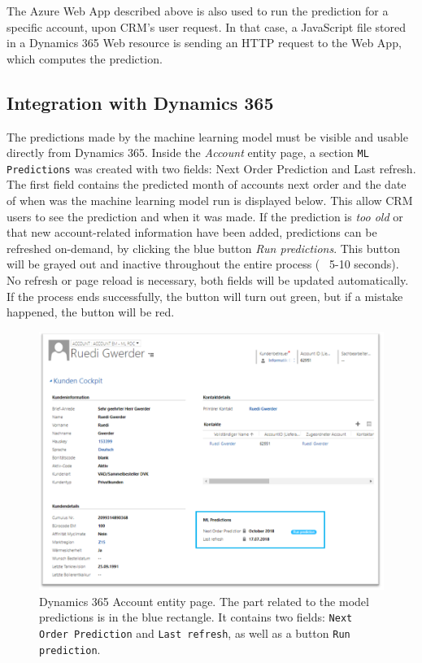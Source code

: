 The Azure Web App described above is also used to run the prediction for a specific account, upon CRM's user request. In that case, a JavaScript file stored in a Dynamics 365 Web resource is sending an HTTP request to the Web App, which computes the prediction.

\subsection{Integration with Dynamics 365}
The predictions made by the machine learning model must be visible and usable directly from Dynamics 365. Inside the \textit{Account} entity page, a section \texttt{ML Predictions} was created with two fields: Next Order Prediction and Last refresh. The first field contains the predicted month of accounts next order and the date of when was the machine learning model run is displayed below. This allow CRM users to see the prediction and when it was made. If the prediction is \textit{too old} or that new account-related information have been added, predictions can be refreshed on-demand, by clicking the blue button \textit{Run predictions}. This button will be grayed out and inactive throughout the entire process (~ 5-10 seconds). No refresh or page reload is necessary, both fields will be updated automatically. If the process ends successfully, the button will turn out green, but if a mistake happened, the button will be red.

\begin{figure}[!h]
    \centering
    \includegraphics[width=12cm]{images/dynamics-account.png}
    \caption[Dynamics 365 \textit{Account} entity page]{Dynamics 365 Account entity page. The part related to the model predictions is in the blue rectangle. It contains two fields: \texttt{Next Order Prediction} and \texttt{Last refresh}, as well as a button \texttt{Run prediction}.}
    \label{fig:dynamics-account-ml-screenshot}
\end{figure}


